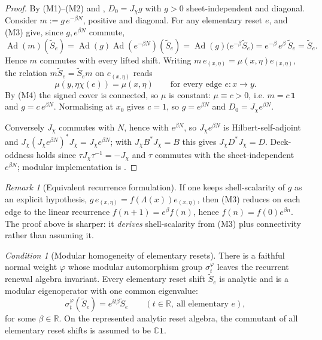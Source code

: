\documentclass[11pt]{article}
\theoremstyle{definition}
\theoremstyle{remark}
\newtheorem{remark}[theorem]{Remark}
\newcommand{\R}{\mathbb{R}}
\newcommand{\C}{\mathbb{C}}
\newcommand{\one}{\mathbf{1}}
\newtheorem{axiom}{Condition}[section]
\newcommand{\Ad}{\operatorname{Ad}}
\newcommand{\Jchi}{J_\chi}
\newcommand{\Stilde}{\widetilde{S}}
\begin{document}
\begin{proof}
By (M1)--(M2) and , $D_0=\Jchi g$ with $g>0$
sheet-independent and diagonal.  Consider $m:=g\,e^{-\beta N}$, positive and
diagonal.  For any elementary reset $e$,  and (M3) give,
since $g,e^{\beta N}$ commute,
\[
  \Ad(m)(\Stilde_e)
  =\Ad(g)\Ad(e^{-\beta N})(\Stilde_e)
  =\Ad(g)\bigl(e^{-\beta}\Stilde_e\bigr)
  =e^{-\beta}\,e^{\beta}\,\Stilde_e
  =\Stilde_e .
\]
Hence $m$ commutes with every lifted shift.  Writing $m\,e_{(x,\eta)}=
\mu(x,\eta)e_{(x,\eta)}$, the relation $m\Stilde_e=\Stilde_e m$ on $e_{(x,\eta)}$
reads
\[
  \mu(y,\eta\chi(e))=\mu(x,\eta)
  \qquad\text{for every edge }e:x\to y .
\]
By (M4) the signed cover is connected, so $\mu$ is constant: $\mu\equiv c>0$, i.e.
$m=c\,\one$ and $g=c\,e^{\beta N}$.  Normalising at $x_0$ gives $c=1$, so
$g=e^{\beta N}$ and $D_0=\Jchi e^{\beta N}$.

Conversely $\Jchi$ commutes with $N$, hence with $e^{\beta N}$, so $\Jchi
e^{\beta N}$ is Hilbert-self-adjoint and $\Jchi(\Jchi e^{\beta N})^*\Jchi=
\Jchi e^{\beta N}$; with $\Jchi B^*\Jchi=B$ this gives $\Jchi D^*\Jchi=D$.
Deck-oddness holds since $\tau\Jchi\tau^{-1}=-\Jchi$ and $\tau$ commutes with the
sheet-independent $e^{\beta N}$; modular implementation is
.
\end{proof}

\begin{remark}[Equivalent recurrence formulation]
\label{rem:recurrence-route}
If one keeps shell-scalarity of $g$ as an explicit hypothesis,
$g\,e_{(x,\eta)}=f(\Lambda(x))e_{(x,\eta)}$, then (M3) reduces on each edge to the
linear recurrence $f(n+1)=e^{\beta}f(n)$, hence $f(n)=f(0)e^{\beta n}$.  The proof
above is sharper: it \emph{derives} shell-scalarity from (M3) plus connectivity
rather than assuming it.
\end{remark}

\begin{axiom}[Modular homogeneity of elementary resets]
\label{ax:modular-homogeneity}
There is a faithful normal weight \(\varphi\) whose modular automorphism group
\(\sigma_t^\varphi\) leaves the recurrent renewal algebra invariant.  Every
elementary reset shift \(\Stilde_e\) is analytic and is a modular eigenoperator
with one common eigenvalue:
\[
  \sigma_t^\varphi(\Stilde_e)=e^{it\beta}\Stilde_e
  \qquad(t\in\R,\ \text{all elementary }e),
\]
for some \(\beta\in\R\).  On the represented analytic reset algebra, the
commutant of all elementary reset shifts is assumed to be \(\C\one\).
\end{axiom}
\end{document}
